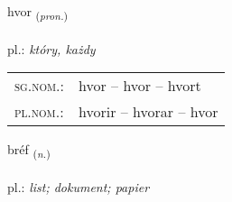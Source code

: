 \documentclass[frontgrid, backgrid]{flacards}\usepackage[]{graphicx}\usepackage[]{xcolor}
\begin{document}
\renewcommand{\blhead}{\vskip5pt {\small\bfseries\footnotesize Fornafn | zaimek }}
\renewcommand{\bcfoot}{\vskip5pt \hspace{2pt}{\small\bfseries\footnotesize 1K}}


{hvor \small{\textsubscript{(\textit{pron.})}} \\[1ex] %
\textphonetic{[kʰvɔːr]} \\
pl.: \emph{który, każdy} \\  [2ex]
\renewcommand*{\arraystretch}{0.8}
\begin{tabular}{ll}
\textsc{sg.nom.}: & hvor  --  hvor -- hvort \\ 
\textsc{pl.nom.}: & hvorir -- hvorar -- hvor
\end{tabular}
}

\renewcommand{\flhead}{\vskip5pt \fboxsep=0pt {\small\bfseries\footnotesize Nafnorð | rzeczownik}}
\renewcommand{\fcfoot}{\vskip5pt \fboxsep=0pt \hspace{2pt}{\small\bfseries\footnotesize 1K}}

\renewcommand{\blhead}{\vskip5pt {\small\bfseries\footnotesize Nafnorð | rzeczownik }}
\renewcommand{\bcfoot}{\vskip5pt \hspace{2pt}{\small\bfseries\footnotesize 1K}}


{bréf \small{\textsubscript{(\textit{n.})}} \\[1ex] %
\textphonetic{[prjɛːv]} \\
pl.: \emph{list; dokument; papier} \\  [2ex]
\renewcommand*{\arraystretch}{0.8}
}

\renewcommand{\flhead}{\vskip5pt \fboxsep=0pt {\small\bfseries\footnotesize Sagnorð | czasownik}}
\renewcommand{\fcfoot}{\vskip5pt \fboxsep=0pt \hspace{2pt}{\small\bfseries\footnotesize 1K}}
\end{document}
